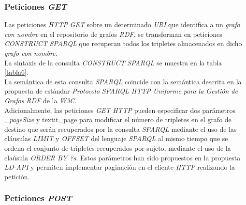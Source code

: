 \subsubsection{Peticiones \textit{GET}}

Las peticiones  \textit{HTTP} \textit{GET} sobre un determinado \textit{URI} que identifica a un \textit{grafo con nombre} en el repositorio de grafos \textit{RDF}, se transforman en peticiones \textit{CONSTRUCT} \textit{SPARQL} que recuperan todos los tripletes almacenados en dicho \textit{grafo con nombre}.\\
La sintaxis de la consulta \textit{CONSTRUCT} \textit{SPARQL} se muestra en la tabla \ref{tabla6}.\\
La sem\'antica de esta consulta \textit{SPARQL} coincide con la sem\'antica descrita en la propuesta de est\'andar \textit{Protocolo SPARQL HTTP Uniforme para la Gesti\'on de Grafos RDF} de la \textit{W3C}.\\
Adicionalmente, las peticiones \textit{GET} \textit{HTTP} pueden especificar dos par\'ametros \textit{\_pageSize} y textit{\_page} para modificar el n\'umero de tripletes en el grafo de destino que ser\'an recuperados por la consulta \textit{SPARQL} mediante el uso de las cl\'ausulas \textit{LIMIT} y \textit{OFFSET} del lenguaje \textit{SPARQL} al mismo tiempo que se ordena el conjunto de tripletes recuperados por sujeto, mediante el uso de la cla\'usula \textit{ORDER BY ?s}. Estos par\'ametros han sido propuestos en la propuesta \textit{LD-API} y permiten implementar paginaci\'on en el cliente \textit{HTTP} realizando la petici\'on.

\subsubsection{Peticiones \textit{POST}}


